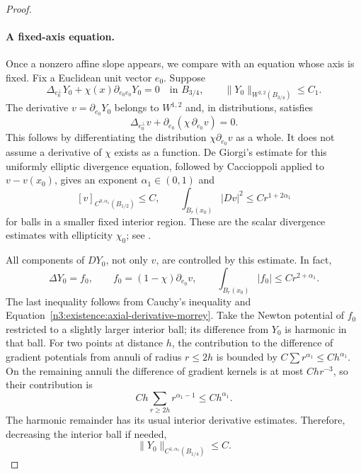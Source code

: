 \begin{proof}
\paragraph{A fixed-axis equation.}
Once a nonzero affine slope appears, we compare with an equation whose
axis is fixed. Fix a Euclidean unit vector $e_0$. Suppose
\begin{equation}\label{n3:existence:fixed-axis}
 \Delta_{e_0^\perp}Y_0+\chi(x)\partial_{e_0e_0}Y_0=0
 \quad\text{in }B_{3/4},\qquad
 \|Y_0\|_{W^{2,2}(B_{3/4})}\le C_1.
\end{equation}
The derivative $v=\partial_{e_0}Y_0$ belongs to $W^{1,2}$ and,
in distributions, satisfies
\begin{equation}\label{n3:existence:axial-derivative-divergence}
 \Delta_{e_0^\perp}v+
 \partial_{e_0}(\chi\,\partial_{e_0}v)=0.
\end{equation}
This follows by differentiating the distribution $\chi\partial_{e_0}v$
as a whole.  It does not assume a derivative of $\chi$ exists as a
function.  De Giorgi's estimate for this uniformly elliptic
divergence equation, followed by Caccioppoli applied to
$v-v(x_0)$, gives an exponent $\alpha_1\in(0,1)$ and
\begin{equation}\label{n3:existence:axial-derivative-morrey}
 [v]_{C^{0,\alpha_1}(B_{1/2})}\le C,
 \qquad
 \int_{B_r(x_0)}|Dv|^2\le Cr^{1+2\alpha_1}
\end{equation}
for balls in a smaller fixed interior region.  These are the scalar
divergence estimates with ellipticity $\chi_0$; see
\cite[Chapter 8]{GilbargTrudinger2001}.

All components of $DY_0$, not only $v$, are controlled by this
estimate.  In fact,
\begin{equation}\label{n3:existence:poisson-source}
 \Delta Y_0=f_0,\qquad
 f_0=(1-\chi)\partial_{e_0}v,
 \qquad
 \int_{B_r(x_0)}|f_0|\le Cr^{2+\alpha_1}.
\end{equation}
The last inequality follows from Cauchy's inequality and
Equation~\eqref{n3:existence:axial-derivative-morrey}.  Take the Newton
potential of $f_0$ restricted to a slightly larger interior ball;
its difference from $Y_0$ is harmonic in that ball.  For two points
at distance $h$, the contribution to the difference of gradient
potentials from annuli of radius $r\le2h$ is bounded by
$C\sum r^{\alpha_1}\le Ch^{\alpha_1}$.  On the remaining annuli
the difference of gradient kernels is at most $Ch r^{-3}$, so their
contribution is
\begin{equation}\label{n3:existence:potential-annuli}
 C h\sum_{r\ge2h}r^{\alpha_1-1}
 \le Ch^{\alpha_1}.
\end{equation}
The harmonic remainder has its usual interior derivative estimates.
Therefore, decreasing the interior ball if needed,
\begin{equation}\label{n3:existence:model-gradient}
 \|Y_0\|_{C^{1,\alpha_1}(B_{1/4})}\le C.
\end{equation}


\end{proof}
